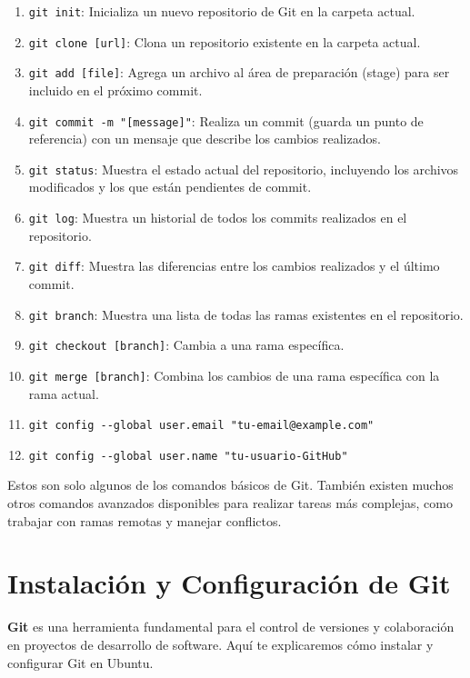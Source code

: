 \documentclass[
  letterpaper,
  DIV=11,
  numbers=noendperiod]{scrartcl}
\providecommand{\tightlist}{%
  \setlength{\itemsep}{0pt}\setlength{\parskip}{0pt}}\usepackage{longtable,booktabs,array}
\begin{document}
\begin{enumerate}
\def\labelenumi{\arabic{enumi}.}
\tightlist
\item
  \texttt{git\ init}: Inicializa un nuevo repositorio de Git en la
  carpeta actual.
\item
  \texttt{git\ clone\ {[}url{]}}: Clona un repositorio existente en la
  carpeta actual.
\item
  \texttt{git\ add\ {[}file{]}}: Agrega un archivo al área de
  preparación (stage) para ser incluido en el próximo commit.
\item
  \texttt{git\ commit\ -m\ "{[}message{]}"}: Realiza un commit (guarda
  un punto de referencia) con un mensaje que describe los cambios
  realizados.
\item
  \texttt{git\ status}: Muestra el estado actual del repositorio,
  incluyendo los archivos modificados y los que están pendientes de
  commit.
\item
  \texttt{git\ log}: Muestra un historial de todos los commits
  realizados en el repositorio.
\item
  \texttt{git\ diff}: Muestra las diferencias entre los cambios
  realizados y el último commit.
\item
  \texttt{git\ branch}: Muestra una lista de todas las ramas existentes
  en el repositorio.
\item
  \texttt{git\ checkout\ {[}branch{]}}: Cambia a una rama específica.
\item
  \texttt{git\ merge\ {[}branch{]}}: Combina los cambios de una rama
  específica con la rama actual.
\item
  \texttt{git\ config\ -\/-global\ user.email\ "tu-email@example.com"}
\item
  \texttt{git\ config\ -\/-global\ user.name\ "tu-usuario-GitHub"}
\end{enumerate}

Estos son solo algunos de los comandos básicos de Git. También existen
muchos otros comandos avanzados disponibles para realizar tareas más
complejas, como trabajar con ramas remotas y manejar conflictos.

\hypertarget{instalaciuxf3n-y-configuraciuxf3n-de-git}{%
\section{Instalación y Configuración de
Git}\label{instalaciuxf3n-y-configuraciuxf3n-de-git}}

\textbf{Git} es una herramienta fundamental para el control de versiones
y colaboración en proyectos de desarrollo de software. Aquí te
explicaremos cómo instalar y configurar Git en Ubuntu.
\end{document}
